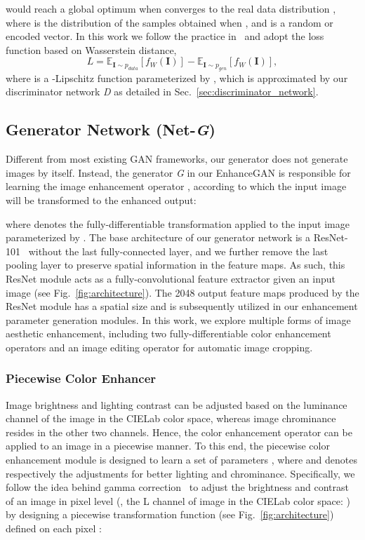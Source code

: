 \documentclass[sigconf]{acmart}
\begin{document}
would reach a global optimum when  converges to the real data distribution , where  is the distribution of the samples  obtained when , and  is a random or encoded vector. 
In this work we follow the practice in~\cite{arjovsky2017wasserstein} and adopt the loss function based on Wasserstein distance,
\begin{dmath}
L = \mathbb{E}_{\mathbf{I} \sim p_{data}}[f_{W}(\mathbf{I})] - \mathbb{E}_{\mathbf{I} \sim p_{gen}}[f_{W}(\mathbf{I})],
\label{eq:w_loss}
\end{dmath}
where  is a -Lipschitz function parameterized by , which is approximated by our discriminator network \textit{D} as detailed in Sec.~\ref{sec:discriminator_network}.

\subsection{Generator Network (Net-\textit{G})}
Different from most existing GAN frameworks, our generator does not generate images by itself. 
Instead, the generator \textit{G} in our EnhanceGAN is responsible for learning the image enhancement operator , according to which the input image will be transformed to the enhanced output: 
 
where  denotes the fully-differentiable transformation applied to the input image parameterized by .  
The base architecture of our generator network is a ResNet-101~\cite{he2016deep} without the last fully-connected layer, and we further remove the last pooling layer to preserve spatial information in the feature maps. As such, this ResNet module acts as a fully-convolutional feature extractor given an input image (see Fig.~\ref{fig:architecture}). 
The 2048 output feature maps produced by the ResNet module has a spatial size  and is subsequently utilized in our enhancement parameter generation modules. 
In this work, we explore multiple forms of image aesthetic enhancement, including two fully-differentiable color enhancement operators and an image editing operator for automatic image cropping. 


\subsubsection{Piecewise Color Enhancer}
\label{subsubsec:piecewise_color_enhancer}
Image brightness and lighting contrast can be adjusted based on the luminance channel of the  image in the CIELab color space, whereas image chrominance resides in the other two channels. Hence, the color enhancement operator  can be applied to an image in a piecewise manner. To this end, the piecewise color enhancement module is designed to learn a set of parameters
,
where  and  denotes respectively the adjustments for better lighting and chrominance. Specifically, we follow the idea behind gamma correction~\cite{pelli1991accurate} to adjust the brightness and contrast of an image in pixel level (\ie, the L channel of image  in the CIELab color space: ) by designing a piecewise transformation function  (see Fig.~\ref{fig:architecture}) defined on each pixel :
\end{document}
